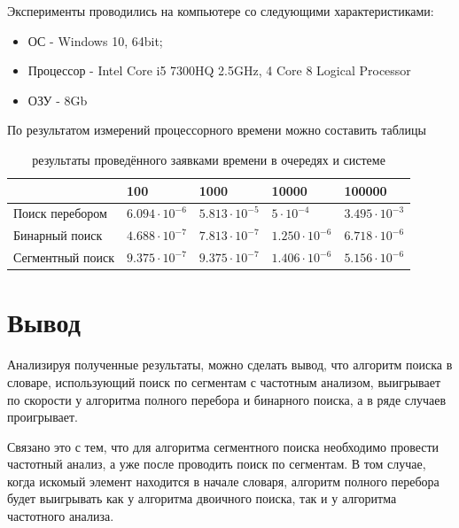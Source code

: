 \documentclass[12pt,a4paper]{report}
\begin{document}
Эксперименты проводились на компьютере со следующими характеристиками:
\begin{itemize}
    \item ОС - Windows 10, 64bit;
    \item Процессор - Intel Core i5 7300HQ 2.5GHz, 4 Core 8 Logical Processor
    \item ОЗУ - 8Gb
\end{itemize}

По результатом измерений процессорного времени можно составить таблицы 

\begin{table}[h!]
\caption{результаты проведённого заявками времени в очередях и системе}
\label{tabular:timesandtenses}
\begin{center}
\begin{tabular}{ | l | l | l | l | l | }
\hline
                     & 100                   & 1000                  & 10000                 & 100000                \\ \hline
    Поиск перебором  & $6.094 \cdot 10^{-6}$ & $5.813 \cdot 10^{-5}$ & $5 \cdot 10^{-4}$     & $3.495 \cdot 10^{-3}$ \\ \hline
    Бинарный поиск   & $4.688 \cdot 10^{-7}$ & $7.813 \cdot 10^{-7}$ & $1.250 \cdot 10^{-6}$ & $6.718 \cdot 10^{-6}$ \\ \hline
    Сегментный поиск & $9.375 \cdot 10^{-7}$ & $9.375 \cdot 10^{-7}$ & $1.406 \cdot 10^{-6}$ & $5.156 \cdot 10^{-6}$ \\ \hline
\end{tabular}
\end{center}
\end{table}

\section{Вывод}

Анализируя полученные результаты, можно сделать вывод, что алгоритм поиска в словаре, использующий поиск 
по сегментам с частотным анализом, выигрывает по скорости у алгоритма полного перебора и бинарного поиска, 
а в ряде случаев проигрывает.

Связано это с тем, что для алгоритма сегментного поиска необходимо провести частотный анализ, а уже после 
проводить поиск по сегментам. 
В том случае, когда искомый элемент находится в начале словаря, алгоритм полного перебора будет выигрывать 
как у алгоритма двоичного поиска, так и у алгоритма частотного анализа.
\end{document}
